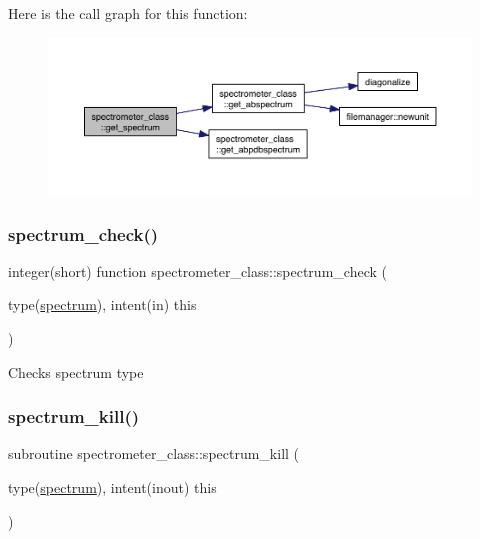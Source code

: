 Here is the call graph for this function\+:\nopagebreak
\begin{figure}[H]
\begin{center}
\leavevmode
\includegraphics[width=350pt]{namespacespectrometer__class_a068171434fa75613677e6357291df1fe_cgraph}
\end{center}
\end{figure}
\mbox{\label{namespacespectrometer__class_a94382eb7e533e6a74dd79200ca0e38ed}} 
\subsubsection{\texorpdfstring{spectrum\+\_\+check()}{spectrum\_check()}}
{\footnotesize\ttfamily integer(short) function spectrometer\+\_\+class\+::spectrum\+\_\+check (\begin{DoxyParamCaption}\item[{type(\hyperlink{structspectrometer__class_1_1spectrum}{spectrum}), intent(in)}]{this }\end{DoxyParamCaption})\hspace{0.3cm}{\ttfamily [private]}}



Checks spectrum type 

\mbox{\label{namespacespectrometer__class_aabaa46560b8ea49cd16b6c11a8a2fe65}} 
\subsubsection{\texorpdfstring{spectrum\+\_\+kill()}{spectrum\_kill()}}
{\footnotesize\ttfamily subroutine spectrometer\+\_\+class\+::spectrum\+\_\+kill (\begin{DoxyParamCaption}\item[{type(\hyperlink{structspectrometer__class_1_1spectrum}{spectrum}), intent(inout)}]{this }\end{DoxyParamCaption})\hspace{0.3cm}{\ttfamily [private]}}



